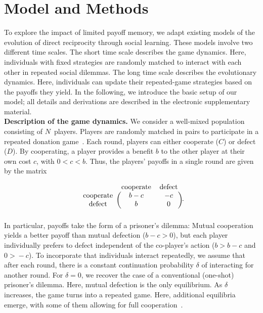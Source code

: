 \documentclass[11pt]{article}
\def\esm{electronic supplementary material}
\theoremstyle{plainCl1}
\theoremstyle{plainCl2}
\begin{document}


\section{Model and Methods}\label{section:model}


To explore the impact of limited payoff memory, we adapt existing models of the evolution of direct reciprocity through social learning. 
These models involve two different time scales. 
The short time scale describes the game dynamics. 
Here, individuals with fixed strategies are randomly matched to interact with each other in repeated social dilemmas. 
The long time scale describes the evolutionary dynamics. 
Here, individuals can update their repeated-game strategies based on the payoffs they yield. 
In the following, we introduce the basic setup of our model; all details and derivations are described in the \esm.\\


\noindent
{\bf Description of the game dynamics.} We consider a well-mixed population consisting of $N$~players.
Players are randomly matched in pairs to participate in a repeated donation game~\citep{sigmund2010calculus}.
Each round, players can either cooperate (\(C\)) or defect (\(D\)). 
By cooperating, a player provides a benefit \(b\) to the other player at their own cost \(c\), with \(0 \!<\! c \!<\! b\). 
Thus, the players' payoffs in a single round are given by the matrix

\begin{equation}
    \begin{blockarray}{ccc}
        & \text{cooperate} & \text{defect} \\
        \begin{block}{c(cc)}
            \text{cooperate} & b - c & -c \\
            \text{defect} & b & 0 \\
        \end{block}
    \end{blockarray}.
\end{equation}
In particular, payoffs take the form of a prisoner's dilemma:
Mutual cooperation yields a better payoff than mutual defection ($b\!-\!c\!>\!0$), but each player individually prefers to defect independent of the co-player's action ($b\!>\!b\!-\!c$ and $0\!>\!-c$). 
To incorporate that individuals interact repeatedly, we assume that after each round, there is a constant continuation probability $\delta$ of interacting for another round. 
For $\delta\!=\!0$, we recover the case of a conventional (one-shot) prisoner's dilemma. 
Here, mutual defection is the only equilibrium. 
As $\delta$ increases, the game turns into a repeated game. Here, additional equilibria emerge, with some of them allowing for full cooperation~\citep{friedman:RES:1971,Akin:chapter:2016,hilbe:GEB:2015,stewart:pnas:2014}. 
\end{document}
